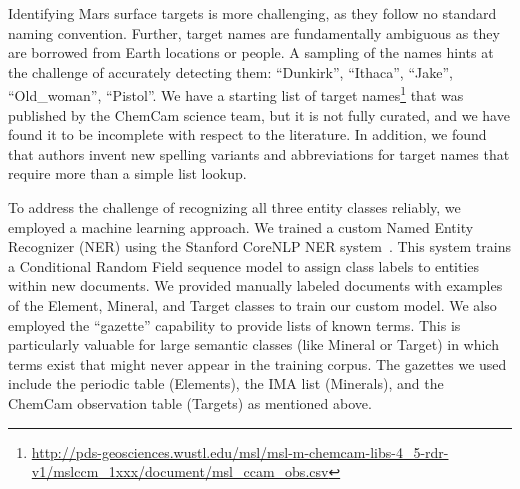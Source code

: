 \documentclass[letterpaper]{article} %
\begin{document}
Identifying Mars surface targets is more challenging, as they follow
no standard naming convention.  Further, target names are
fundamentally ambiguous as they are borrowed from Earth locations or
people.  A sampling of the names hints at the challenge of accurately
detecting them: ``Dunkirk'', ``Ithaca'', ``Jake'', ``Old\_woman'',
``Pistol''.  We have a starting list of target
names\footnote{\url{http://pds-geosciences.wustl.edu/msl/msl-m-chemcam-libs-4_5-rdr-v1/mslccm_1xxx/document/msl_ccam_obs.csv}}
that was published by the ChemCam science team, but it is not fully
curated, and we have found it to be incomplete with respect to the
literature.
%
In addition, we found that authors invent new spelling
variants and abbreviations for target names that require more than a
simple list lookup.

To address the challenge of recognizing all three entity classes
reliably, we employed a machine learning approach.  We trained a
custom Named Entity Recognizer (NER) using the Stanford CoreNLP NER
system~\cite{finkel:ner05}.  This system trains a Conditional Random
Field sequence model to assign class labels to entities within new
documents.  We provided manually labeled documents with examples of
the Element, Mineral, and Target classes to train our custom
model.  We also employed the ``gazette'' capability to provide lists
of known terms.  This is particularly valuable for large semantic
classes (like Mineral or Target) in which terms exist that might never
appear in the training corpus.  The gazettes we used include the
periodic table (Elements), the IMA list (Minerals), and the ChemCam
observation table (Targets) as mentioned above.




\end{document}

